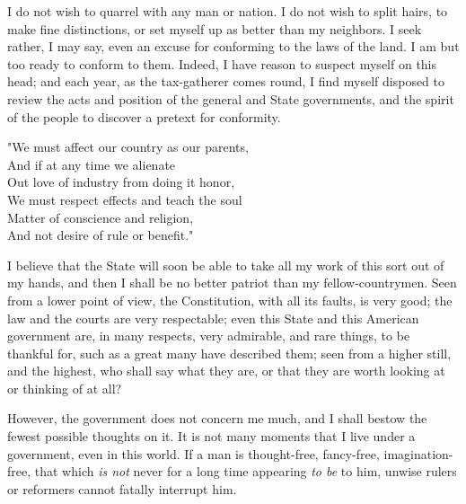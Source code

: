 \documentclass[12pt]{article}
\begin{document}
I do not wish to quarrel with any man or nation. I do not wish to split
hairs, to make fine distinctions, or set myself up as better than my
neighbors. I seek rather, I may say, even an excuse for conforming to
the laws of the land. I am but too ready to conform to them. Indeed, I
have reason to suspect myself on this head; and each year, as the
tax-gatherer comes round, I find myself disposed to review the acts and
position of the general and State governments, and the spirit of the
people to discover a pretext for conformity.
\begin{displayquote}
"We must affect our country as our parents,\\
And if at any time we alienate\\
Out love of industry from doing it honor,\\
We must respect effects and teach the soul\\
Matter of conscience and religion,\\
And not desire of rule or benefit."\\
\end{displayquote}
I believe that the State will soon be able to take all my work of this
sort out of my hands, and then I shall be no better patriot than my
fellow-countrymen. Seen from a lower point of view, the Constitution,
with all its faults, is very good; the law and the courts are very
respectable; even this State and this American government are, in many
respects, very admirable, and rare things, to be thankful for, such as a
great many have described them; seen from a higher still, and the
highest, who shall say what they are, or that they are worth looking at
or thinking of at all?

However, the government does not concern me much, and I shall bestow the
fewest possible thoughts on it. It is not many moments that I live under
a government, even in this world. If a man is thought-free, fancy-free,
imagination-free, that which \emph{is not} never for a long time
appearing \emph{to be} to him, unwise rulers or reformers cannot fatally
interrupt him.
\end{document}
